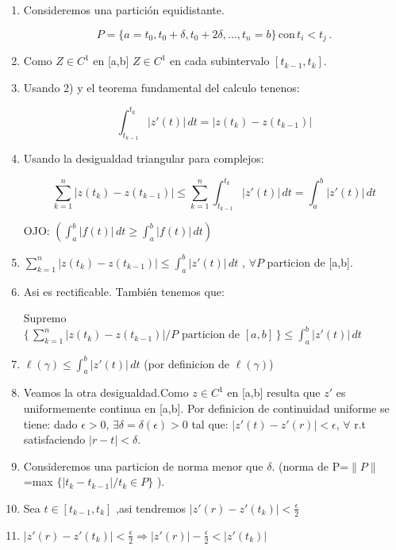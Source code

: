 \documentclass[a4paper,12pt]{article}
\begin{document}
\begin{enumerate}
\item Consideremos una partición equidistante.

$$P=\{a=t_0,t_0+\delta,t_0+2\delta,...,t_n=b\}\, \text{con}\, t_i < t_j\,.$$

\item Como $Z \in C^1$ en [a,b] $Z \in C^1$ en cada subintervalo $[t_{k-1},t_k]$.

\item Usando 2) y el teorema fundamental del calculo tenenos:

$$\int_{t_{k-1}}^{t_k} |z'(t)|\,dt=|z(t_k)-z(t_{k-1})|$$

\item Usando la desigualdad triangular para complejos:

$$\sum_{k=1}^n |z(t_k)-z(t_{k-1})| \leq \sum_{k=1}^n \int_{t_{k-1}}^{t_k} |z'(t)|\,dt = \int_a^b |z'(t)|\,dt$$

OJO: $\left(\int_a^b |f(t)|\,dt \geq \int_a^b |f(t)|\,dt\right)$

\item $\sum_{k=1}^n |z(t_k)-z(t_{k-1})| \leq \int_a^b |z'(t)|\,dt$ , $\forall P$ particion de [a,b].

\item Asi es rectificable. También tenemos que:

Supremo $\{\,\sum_{k=1}^n |z(t_k)-z(t_{k-1})| / P \text{ particion de } [a,b] \,\} \leq \int_a^b |z'(t)|\,dt$


\item $\ell(\gamma) \leq \int_a^b |z'(t)|\,dt$ (por definicion de $\ell(\gamma)$)

\item Veamos la otra desigualdad.Como $z \in C^1$ en [a,b] resulta que $z'$ es uniformemente continua en [a,b]. Por definicion de continuidad uniforme se tiene: dado $\epsilon>0$, $\exists \delta = \delta(\epsilon)>0$ tal que: $|z'(t)-z'(r)| < \epsilon$, $\forall$ r.t satisfaciendo $|r-t| < \delta$.

\item Consideremos una particion de norma menor que $\delta$. (norma de P=$\|P\|$=max $\{|t_k-t_{k-1}| / t_k \in P \}$ ).

\item Sea $t \in [t_{k-1},t_k]$ ,asi tendremos $|z'(r)-z'(t_k)|<\frac{\epsilon}{2}$

\item  $|z'(r)-z'(t_k)|<\frac{\epsilon}{2} \Rightarrow |z'(r)|-\frac{\epsilon}{2}<|z'(t_k)|$


\end{enumerate}
\end{document}

